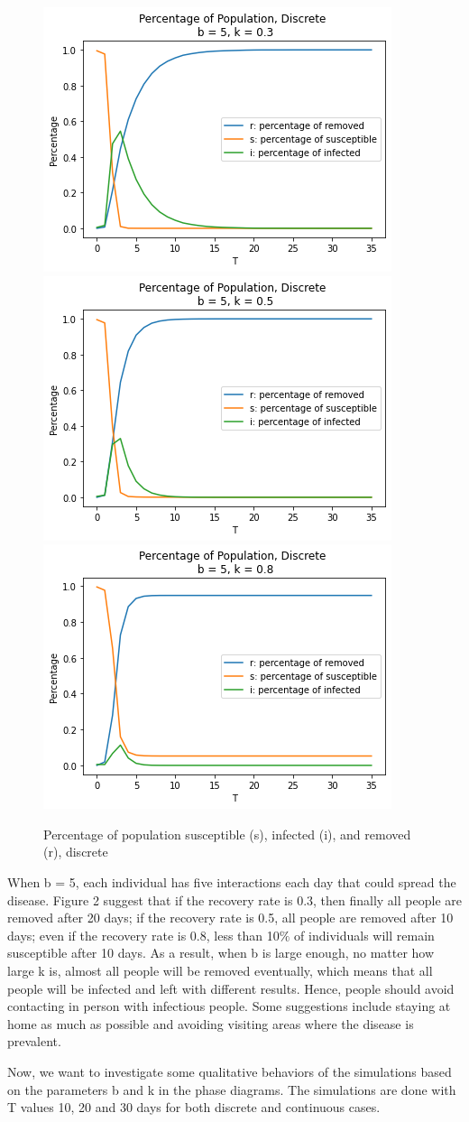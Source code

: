 \documentclass{article}
\begin{document}
\begin{figure}[htp]

\centering
\includegraphics[width=.3\textwidth]{Figure1_discrete_sir_b5_k1.png}\hfill
\includegraphics[width=.3\textwidth]{Figure1_discrete_sir_b5_k2.png}\hfill
\includegraphics[width=.3\textwidth]{Figure1_discrete_sir_b5_k3.png}

\caption{Percentage of population susceptible (s), infected (i), and removed (r), discrete}
\label{fig:figure3}

\end{figure}



When b = 5, each individual has five interactions each day that could spread the disease. Figure 2 suggest that if the recovery rate is 0.3, then finally all people are removed after 20 days; if the recovery rate is 0.5, all people are removed after 10 days; even if the recovery rate is 0.8, less than 10$\%$ of individuals will remain susceptible after 10 days. As a result, when b is large enough, no matter how large k is, almost all people will be removed eventually, which means that all people will be infected and left with different results. Hence, people should avoid contacting in person with infectious people. Some suggestions include staying at home as much as possible and avoiding visiting areas where the disease is prevalent.


Now, we want to investigate some qualitative behaviors of the simulations based on the parameters b and k in the phase diagrams.
The simulations are done with T values 10, 20 and 30 days for both discrete and continuous cases.
\end{document}

